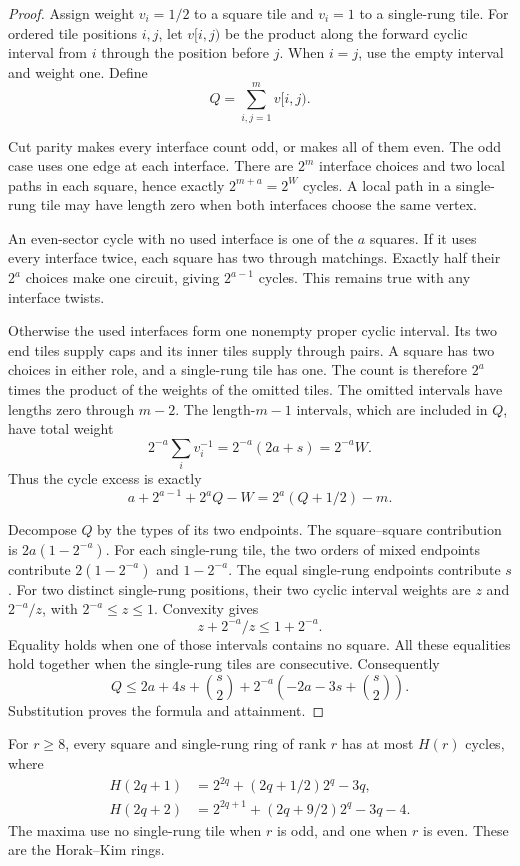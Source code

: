 \begin{proof}
Assign weight $v_i=1/2$ to a square tile and $v_i=1$ to a single-rung tile.
For ordered tile positions $i,j$, let $v[i,j)$ be the product along the forward cyclic interval from $i$ through the position before $j$.
When $i=j$, use the empty interval and weight one.
Define
\[
 Q=\sum_{i,j=1}^{m}v[i,j).
\]

Cut parity makes every interface count odd, or makes all of them even.
The odd case uses one edge at each interface.
There are $2^m$ interface choices and two local paths in each square, hence exactly $2^{m+a}=2^W$ cycles.
A local path in a single-rung tile may have length zero when both interfaces choose the same vertex.

An even-sector cycle with no used interface is one of the $a$ squares.
If it uses every interface twice, each square has two through matchings.
Exactly half their $2^a$ choices make one circuit, giving $2^{a-1}$ cycles.
This remains true with any interface twists.

Otherwise the used interfaces form one nonempty proper cyclic interval.
Its two end tiles supply caps and its inner tiles supply through pairs.
A square has two choices in either role, and a single-rung tile has one.
The count is therefore $2^a$ times the product of the weights of the omitted tiles.
The omitted intervals have lengths zero through $m-2$.
The length-$m-1$ intervals, which are included in $Q$, have total weight
\[
 2^{-a}\sum_i v_i^{-1}=2^{-a}(2a+s)=2^{-a}W.
\]
Thus the cycle excess is exactly
\[
 a+2^{a-1}+2^aQ-W
 =2^a(Q+1/2)-m.
\]

Decompose $Q$ by the types of its two endpoints.
The square--square contribution is $2a(1-2^{-a})$.
For each single-rung tile, the two orders of mixed endpoints contribute
$2(1-2^{-a})$ and $1-2^{-a}$.
The equal single-rung endpoints contribute $s$.
For two distinct single-rung positions, their two cyclic interval weights are $z$ and $2^{-a}/z$, with $2^{-a}\le z\le1$.
Convexity gives
\[
 z+2^{-a}/z\le1+2^{-a}.
\]
Equality holds when one of those intervals contains no square.
All these equalities hold together when the single-rung tiles are consecutive.
Consequently
\[
 Q\le2a+4s+\binom s2
       +2^{-a}\left(-2a-3s+\binom s2\right).
\]
Substitution proves the formula and attainment.
\end{proof}

\begin{theorem}
\label{thm:four-coefficient-ring-maximum}
For $r\ge8$, every square and single-rung ring of rank $r$ has at most $H(r)$ cycles, where
\[
 \begin{aligned}
 H(2q+1)&=2^{2q}+(2q+1/2)2^q-3q,\\
 H(2q+2)&=2^{2q+1}+(2q+9/2)2^q-3q-4.
 \end{aligned}
\]
The maxima use no single-rung tile when $r$ is odd, and one when $r$ is even.
These are the Horak--Kim rings.
\end{theorem}


